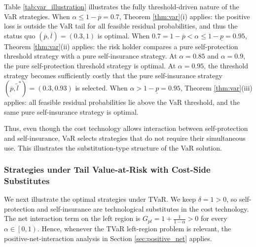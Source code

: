 \documentclass[a4paper,12pt]{article}
\begin{document}
\noindent
Table \ref{tab:var_illustration} illustrates the fully threshold-driven nature of the VaR strategies. When $\alpha\leq 1-\overline{p}=0.7$, Theorem \ref{thm:var}(i) applies: the positive loss is outside the VaR tail for all feasible residual probabilities, and thus the status quo $\left(\overline{p},\overline{l}\right)=\left(0.3,1\right)$ is optimal. When $0.7=1-\overline{p}<\alpha\leq 1-\underline{p}=0.95$, Theorem \ref{thm:var}(ii) applies: the risk holder compares a pure self-protection threshold strategy with a pure self-insurance strategy. At $\alpha=0.85$ and $\alpha=0.9$, the pure self-protection threshold strategy is optimal. At $\alpha=0.95$, the threshold strategy becomes sufficiently costly that the pure self-insurance strategy $\left(\overline p,\tilde l^*\right)=\left(0.3,0.93\right)$ is selected. When $\alpha>1-\underline{p}=0.95$, Theorem \ref{thm:var}(iii) applies: all feasible residual probabilities lie above the VaR threshold, and the same pure self-insurance strategy is optimal.

Thus, even though the cost technology allows interaction between self-protection and self-insurance, VaR selects strategies that do not require their simultaneous use. This illustrates the substitution-type structure of the VaR solution.

\subsubsection{Strategies under Tail Value-at-Risk with Cost-Side Substitutes}

We next illustrate the optimal strategies under TVaR. We keep $\delta=1>0$, so self-protection and self-insurance are technological substitutes in the cost technology. The net interaction term on the left region is $G_{pl}=1+\frac{1}{1-\alpha}>0$ for every $\alpha\in\left[0,1\right)$. Hence, whenever the TVaR left-region problem is relevant, the positive-net-interaction analysis in Section \ref{sec:positive_net} applies.
\end{document}
